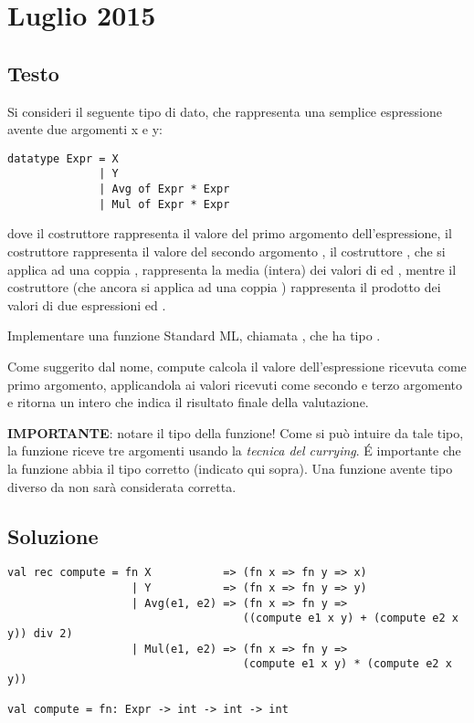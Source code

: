 \section{Luglio 2015}

\subsection{Testo}

Si consideri il seguente tipo di dato, che rappresenta una semplice espressione avente due argomenti x e y:

\begin{lstlisting}[style = SML, caption = {Definizione del tipo di dato \sml{espressione Lambda}}]
datatype Expr = X
			  | Y
			  | Avg of Expr * Expr
			  | Mul of Expr * Expr
\end{lstlisting}

dove il costruttore  rappresenta il valore del primo argomento  dell'espressione, %
il costruttore  rappresenta il valore del secondo argomento , %
il costruttore , che si applica ad una coppia , rappresenta la media (intera) dei valori di  ed , %
mentre il costruttore  (che ancora si applica ad una coppia ) rappresenta il prodotto dei valori di due espressioni  ed .

\medskip
Implementare una funzione Standard ML, chiamata , che ha tipo .

\medskip
Come suggerito dal nome, compute calcola il valore dell'espressione ricevuta come primo argomento, applicandola ai valori ricevuti come secondo e terzo argomento e ritorna un intero che indica il risultato finale della valutazione.

\medskip
\textbf{IMPORTANTE}: notare il tipo della funzione! Come si può intuire da tale tipo, la funzione riceve tre argomenti usando la \emph{tecnica del currying}. \'E importante che la funzione abbia il tipo corretto (indicato qui sopra). Una funzione avente tipo diverso da  non sarà considerata corretta.

\subsection{Soluzione}

\begin{lstlisting}[style = SML, caption = {Definizione della funzione \sml{compute}}]
val rec compute = fn X		 	 => (fn x => fn y => x)
				   | Y			 => (fn x => fn y => y)
				   | Avg(e1, e2) => (fn x => fn y =>
				   					((compute e1 x y) + (compute e2 x y)) div 2)
				   | Mul(e1, e2) => (fn x => fn y =>
				   					(compute e1 x y) * (compute e2 x y))

val compute = fn: Expr -> int -> int -> int
\end{lstlisting}
